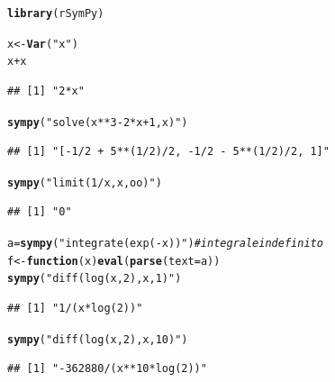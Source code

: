 \documentclass[onecolumn,11pt]{book}\usepackage[]{graphicx}\usepackage[]{color}
\makeatletter
\newcommand{\hlstr}[1]{\textcolor[rgb]{0.192,0.494,0.8}{#1}}%
\newcommand{\hlcom}[1]{\textcolor[rgb]{0.678,0.584,0.686}{\textit{#1}}}%
\newcommand{\hlopt}[1]{\textcolor[rgb]{0,0,0}{#1}}%
\newcommand{\hlstd}[1]{\textcolor[rgb]{0.345,0.345,0.345}{#1}}%
\newcommand{\hlkwa}[1]{\textcolor[rgb]{0.161,0.373,0.58}{\textbf{#1}}}%
\newcommand{\hlkwb}[1]{\textcolor[rgb]{0.69,0.353,0.396}{#1}}%
\newcommand{\hlkwc}[1]{\textcolor[rgb]{0.333,0.667,0.333}{#1}}%
\newcommand{\hlkwd}[1]{\textcolor[rgb]{0.737,0.353,0.396}{\textbf{#1}}}%
\newenvironment{kframe}{%
 \def\at@end@of@kframe{}%
 \ifinner\ifhmode%
  \def\at@end@of@kframe{\end{minipage}}%
  \begin{minipage}{\columnwidth}%
 \fi\fi%
 \def\FrameCommand##1{\hskip\@totalleftmargin \hskip-\fboxsep
 \colorbox{shadecolor}{##1}\hskip-\fboxsep
     \hskip-\linewidth \hskip-\@totalleftmargin \hskip\columnwidth}%
 \MakeFramed {\advance\hsize-\width
   \@totalleftmargin\z@ \linewidth\hsize
   \@setminipage}}%
 {\par\unskip\endMakeFramed%
 \at@end@of@kframe}
\newenvironment{knitrout}{}{} %
\makeatother
\begin{document}
\begin{knitrout}
\color{fgcolor}\begin{kframe}
\begin{alltt}
\hlkwd{library}\hlstd{(rSymPy)}
\end{alltt}


{\ttfamily\noindent\itshape\color{messagecolor}{\#\# Loading required package: rJython}}

{\ttfamily\noindent\itshape\color{messagecolor}{\#\# Loading required package: rJava}}

{\ttfamily\noindent\itshape\color{messagecolor}{\#\# Loading required package: rjson}}\begin{alltt}
\hlstd{x} \hlkwb{<-} \hlkwd{Var}\hlstd{(}\hlstr{"x"}\hlstd{)}
\hlstd{x}\hlopt{+}\hlstd{x}
\end{alltt}
\begin{verbatim}
## [1] "2*x"
\end{verbatim}
\begin{alltt}
\hlkwd{sympy}\hlstd{(}\hlstr{"solve(x**3 - 2*x+1, x)"}\hlstd{)}
\end{alltt}
\begin{verbatim}
## [1] "[-1/2 + 5**(1/2)/2, -1/2 - 5**(1/2)/2, 1]"
\end{verbatim}
\begin{alltt}
\hlkwd{sympy}\hlstd{(}\hlstr{"limit(1/x, x, oo)"}\hlstd{)}
\end{alltt}
\begin{verbatim}
## [1] "0"
\end{verbatim}
\begin{alltt}
\hlstd{a}\hlkwb{=}\hlkwd{sympy}\hlstd{(}\hlstr{"integrate(exp(-x))"}\hlstd{)} \hlcom{# integrale indefinito}
 \hlstd{f}\hlkwb{<-}\hlkwa{function}\hlstd{(}\hlkwc{x}\hlstd{)}  \hlkwd{eval}\hlstd{(}\hlkwd{parse}\hlstd{(}\hlkwc{text}\hlstd{=a))}
\hlkwd{sympy}\hlstd{(}\hlstr{"diff(log(x,2), x, 1)"}\hlstd{)}
\end{alltt}
\begin{verbatim}
## [1] "1/(x*log(2))"
\end{verbatim}
\begin{alltt}
\hlkwd{sympy}\hlstd{(}\hlstr{"diff(log(x,2), x, 10)"}\hlstd{)}
\end{alltt}
\begin{verbatim}
## [1] "-362880/(x**10*log(2))"
\end{verbatim}
\end{kframe}
\end{knitrout}
\end{document}
